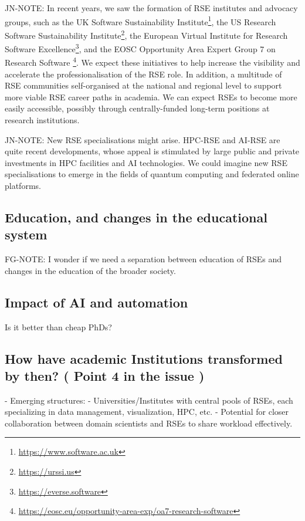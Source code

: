 \documentclass{eceasst}
\begin{document}
\begin{FramedParagraphWithFootnotes}
JN-NOTE:
In recent years, we saw the formation of RSE institutes and advocacy groups, such as
the UK Software Sustainability Institute\footnote{\url{https://www.software.ac.uk}},
the US Research Software Sustainability Institute\footnote{\url{https://urssi.us}},
the European Virtual Institute for Research Software Excellence\footnote{\url{https://everse.software}},
and the EOSC Opportunity Area Expert Group 7 on Research Software%
\footnote{\url{https://eosc.eu/opportunity-area-exp/oa7-research-software}}.
We expect these initiatives to help increase the visibility and accelerate
the professionalisation of the RSE role.
In addition, a multitude of RSE communities self-organised at the national
and regional level to support more viable RSE career paths in academia.
We can expect RSEs to become more easily accessible,
possibly through centrally-funded long-term positions at research institutions.
\end{FramedParagraphWithFootnotes}

\begin{FramedParagraphWithFootnotes}
JN-NOTE:
New RSE specialisations might arise.
HPC-RSE and AI-RSE are quite recent developments,
whose appeal is stimulated by large public and private
investments in HPC facilities and AI technologies.
We could imagine new RSE specialisations to emerge in the fields
of quantum computing and federated online platforms.
\end{FramedParagraphWithFootnotes}


\subsection{Education, and changes in the educational system}
FG-NOTE: I wonder if we need a separation between education of RSEs and changes in the education of the broader society.

\subsection{Impact of AI and automation}
Is it better than cheap PhDs?

\subsection{How have academic Institutions transformed by then? ( Point 4 in the issue )}
- Emerging structures:
  - Universities/Institutes with central pools of RSEs, each specializing in data management, visualization, HPC, etc.
  - Potential for closer collaboration between domain scientists and RSEs to share workload effectively.
\end{document}
